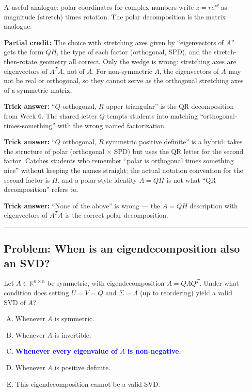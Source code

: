 \documentclass[12pt]{amsart}
\newcommand{\divider}{
  \vspace{-1em}
  \noindent
  \raisebox{-0.15ex}{\textbullet}%
  \hspace{0.5em}%
  \rule[0.5ex]{0.95\textwidth}{1.0pt}%
  \hspace{0.5em}%
  \raisebox{-0.15ex}{\textbullet}%
  \vspace{0em}
}
\begin{document}
A useful analogue: polar coordinates for complex numbers write $z = re^{i\theta}$
as magnitude (stretch) times rotation. The polar decomposition is the matrix
analogue.

\textbf{Partial credit:}
The choice with stretching axes given by ``eigenvectors of $A$'' gets the form
$QH$, the type of each factor (orthogonal, SPD), and the stretch-then-rotate
geometry all correct. Only the wedge is wrong: stretching axes are eigenvectors
of $A^TA$, not of $A$. For non-symmetric $A$, the eigenvectors of $A$ may not
be real or orthogonal, so they cannot serve as the orthogonal stretching axes
of a symmetric matrix.

\textbf{Trick answer:}
``$Q$ orthogonal, $R$ upper triangular'' is the QR decomposition from Week 6.
The shared letter $Q$ tempts students into matching ``orthogonal-times-something''
with the wrong named factorization.

\textbf{Trick answer:}
``$Q$ orthogonal, $R$ symmetric positive definite'' is a hybrid: takes the
structure of polar (orthogonal $\times$ SPD) but uses the QR letter for the
second factor. Catches students who remember ``polar is orthogonal times
something nice'' without keeping the names straight; the actual notation
convention for the second factor is $H$, and a polar-style identity $A = QH$
is not what ``QR decomposition'' refers to.

\textbf{Trick answer:}
``None of the above'' is wrong --- the $A = QH$ description with eigenvectors
of $A^TA$ is the correct polar decomposition.

\divider

\subsection*{Problem: When is an eigendecomposition also an SVD?}

Let $A \in \mathbb{R}^{n \times n}$ be symmetric, with eigendecomposition
$A = Q\Lambda Q^T$.
Under what condition does setting $U = V = Q$ and $\Sigma = \Lambda$
(up to reordering) yield a valid SVD of $A$?

\begin{enumerate}[(A)]
\item Whenever $A$ is symmetric.
\item Whenever $A$ is invertible.
\item \textcolor{blue}{\textbf{Whenever every eigenvalue of $A$ is non-negative.}}
\item Whenever $A$ is positive definite.
\item This eigendecomposition cannot be a valid SVD.
\end{enumerate}
\end{document}
